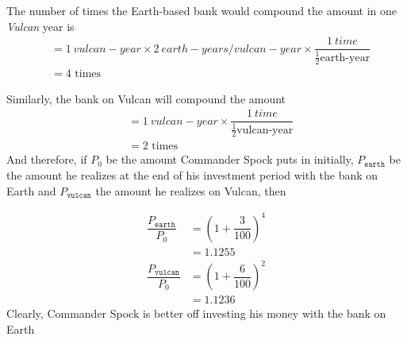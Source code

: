 \begin{solution}[\fullpage]
	The number of times the Earth-based bank would compound the amount in one \textit{Vulcan}
	year is 
	\begin{align}
		&= \SI{1}{vulcan-year}\times\SI{2}{earth-years\per vulcan-year}\times
		\dfrac{\SI{1}{time}}{\frac{1}{2}\text{earth-year}} \\
		&= 4\text{ times}
	\end{align}
	
	Similarly, the bank on Vulcan will compound the amount
	\begin{align}
		&= \SI{1}{vulcan-year}\times\dfrac{\SI{1}{time}}{\frac{1}{2}\text{vulcan-year}} \\
		&= 2\text{ times}
	\end{align}
	And therefore, if $P_0$ be the amount Commander Spock puts in initially, 
	$P_{\texttt{earth}}$ be the amount he realizes at the end of his investment period with the bank
	on Earth and $P_{\texttt{vulcan}}$ the amount he realizes on Vulcan, then 
	
	\begin{align}
		\dfrac{P_\texttt{earth}}{P_0} &= \left( 1 + \dfrac{3}{100}\right)^4 \\
		                       &= 1.1255 \\
		\dfrac{P_\texttt{vulcan}}{P_0} &= \left( 1 + \dfrac{6}{100}\right)^2 \\
		                        &= 1.1236
	\end{align}
	Clearly, Commander Spock is better off investing his
	money with the bank on Earth
\end{solution}
